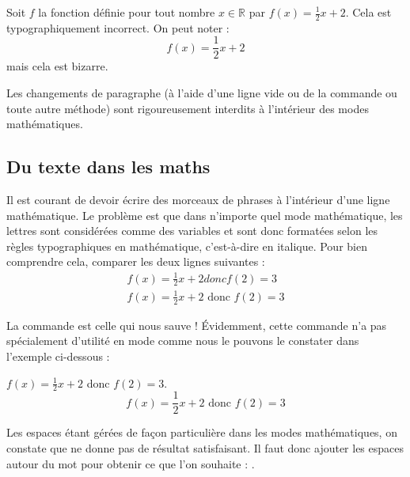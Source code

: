 \documentclass[10pt,french,openright,twoside]{book}
\begin{document}
{\NewFont
\begin{SideBySideExample}
    Soit $f$ la fonction d\'efinie pour tout nombre
    $x \in \mathds R$ par
    $\displaystyle{f(x) = \frac 12 x + 2}$.
    Cela est typographiquement incorrect. On peut noter :
    \[\textstyle{f(x) = \frac 12 x + 2}\]
    mais cela est bizarre.
\end{SideBySideExample}
}\bigskip

\begin{info}
    Les changements de paragraphe (à l'aide d'une ligne vide ou de la commande  ou toute autre méthode) sont rigoureusement interdits à l'intérieur des modes mathématiques.
\end{info}

\subsection{Du texte dans les maths}

Il est courant de devoir écrire des morceaux de phrases à l'intérieur d'une ligne mathématique. Le problème est que dans n'importe quel mode mathématique, les lettres sont considérées comme des variables et sont donc formatées selon les règles typographiques en mathématique, c'est-à-dire en italique. Pour bien comprendre cela, comparer les deux lignes suivantes :
\[\begin{array}{c}
  	f(x) = \frac 12 x + 2 donc f(2) = 3 \\[10pt]
  	f(x) = \frac 12 x + 2 \text{ donc } f(2) = 3
  \end{array}\]

La commande  est celle qui nous sauve ! \'Evidemment, cette commande n'a pas spécialement d'utilité en mode  comme nous le pouvons le constater dans l'exemple ci-dessous :\bigskip

{\NewFont
\begin{SideBySideExample}
    $f(x) = \frac 12 x + 2$ donc $f(2) = 3$.
    \[f(x) = \frac 12 x + 2 \text{ donc } f(2) = 3\]
\end{SideBySideExample}
}\bigskip

\begin{info}
    Les espaces étant gérées de façon particulière dans les modes mathématiques, on constate que  ne donne pas de résultat satisfaisant. Il faut donc ajouter les espaces autour du mot pour obtenir ce que l'on souhaite : .
\end{info}
\end{document}
